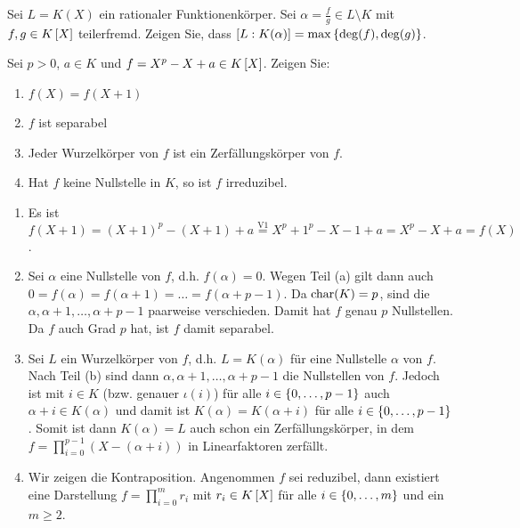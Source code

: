 \begin{exercisePage}
	
	\begin{homework}
		Sei $L=K(X)$ ein rationaler Funktionenkörper. Sei $\alpha = \frac{f}{g} \in L \setminus K$ mit $f,g \in \polynom[K]$ teilerfremd. Zeigen Sie, dass $[L : K(\alpha)] = \max\left\{ \deg(f) , \deg(g) \right\}$.
	\end{homework}
	
	\pagebreak
	
	
	\begin{homework}
		Sei $p > 0$, $a \in K$ und $f = X^p - X + a \in \polynom[K]$. Zeigen Sie:
		\begin{enumerate}[leftmargin=*, label=(\alph*), nolistsep, topsep=-\parskip]
			\item $f(X) = f(X+1)$
			\item $f$ ist separabel
			\item Jeder Wurzelkörper von $f$ ist ein Zerfällungskörper von $f$.
			\item Hat $f$ keine Nullstelle in $K$, so ist $f$ irreduzibel.
		\end{enumerate}
	\end{homework}
	\begin{enumerate}[leftmargin=*, label=(zu \alph*)]
		\item Es ist $f(X+1) = (X+1)^p - (X+1) + a \overset{\text{V1}}{=} X^p + 1^p - X - 1 + a = X^p - X + a = f(X)$.
		\item Sei $\alpha$ eine Nullstelle von $f$, d.h. $f(\alpha) = 0$. Wegen Teil (a) gilt dann auch $0 = f(\alpha) = f(\alpha + 1) = \dots = f(\alpha + p - 1)$. Da $\operatorname{char}(K) = p$, sind die $\alpha, \alpha + 1 , \dots , \alpha + p - 1$ paarweise verschieden. Damit hat $f$ genau $p$ Nullstellen. Da $f$ auch Grad $p$ hat, ist $f$ damit separabel. 
		\item Sei $L$ ein Wurzelkörper von $f$, d.h. $L = K(\alpha)$ für eine Nullstelle $\alpha$ von $f$. Nach Teil (b) sind dann $\alpha, \alpha + 1 , \dots , \alpha + p - 1$ die Nullstellen von $f$. Jedoch ist mit $i \in K$ (bzw. genauer $\iota(i)$) für alle $i \in \left\{ 0, \dots , p-1 \right\}$ auch $\alpha + i \in K(\alpha)$ und damit ist $K(\alpha) = K(\alpha + i)$ für alle $i \in \left\{ 0, \dots , p-1 \right\}$. Somit ist dann $K(\alpha) = L$ auch schon ein Zerfällungskörper, in dem $f = \prod_{i=0}^{p-1} (X - (\alpha + i))$ in Linearfaktoren zerfällt.
		\item Wir zeigen die Kontraposition. Angenommen $f$ sei reduzibel, dann existiert eine Darstellung $f = \prod_{i = 0}^m r_i$ mit $r_i \in \polynom[K]$ für alle $i \in \left\{ 0 , \dots , m \right\}$ und ein $m \geq 2$. 
		

\end{enumerate}
\end{exercisePage}

